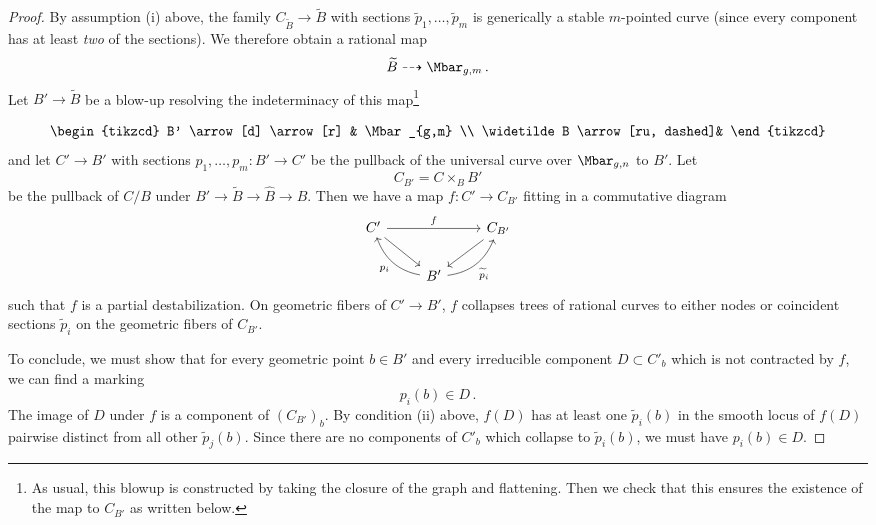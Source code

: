 \documentclass[a4paper,12pt]{article} %
\theoremstyle{definition}
\theoremstyle{plain}%
\newcommand{\jocomment}[1]{}
\begin{document}
\begin{proof}
By assumption (i) above, the family $C_{\widetilde B} \to \widetilde B$ with sections $\widetilde p_1, \ldots, \widetilde p_m$ is generically a stable $m$-pointed curve (since 
every component has at least \emph{two} of the sections). We therefore obtain
a rational map $$\widetilde B \dashrightarrow \Mbar_{g,m}\, .$$
Let $B' \to \widetilde B$ be a blow-up resolving the indeterminacy of this map\footnote{As usual, this blowup is constructed by taking the closure of the graph and flattening. Then we check that this ensures the existence of the map to $C_{B'}$ as written below.}

\begin{equation}
\begin{tikzcd}
B' \arrow[d] \arrow[r] & \Mbar_{g,m} \\
\widetilde B \arrow[ru, dashed]&
\end{tikzcd}    
\end{equation}
 and let $C' \to B'$ with sections $p_1, \ldots, p_m : B' \to C'$
 be the pullback of the universal curve over $\Mbar_{g,n}$ to $B'$. Let 
 $$C_{B'} = C \times_B B'$$ 
 be the pullback of $C/B$ under $B' \to \widetilde B \to \widehat B \to B$. Then we have a map $f: C' \to C_{B'}$ fitting in a commutative diagram
 \begin{equation} \label{eqn:partstabilizationalteration}
 \begin{tikzcd}
 C' \arrow[rr,"f"] \arrow[rd] & & C_{B'} \arrow[ld]\\
 & B' \arrow[ul,"p_i", bend left] \arrow[ur, "\widetilde p_i", bend right, swap] &
 \end{tikzcd}
 \end{equation}
 such that $f$ is a partial destabilization. On geometric fibers of $C'\to B'$,
 $f$ collapses trees of rational curves to either nodes or coincident
  sections $\widetilde p_i$ on
 the geometric fibers of $C_{B'}$.
 
 To conclude, we must show that for every geometric point $b \in B'$ and every irreducible component $D \subset C'_b$ which is not contracted by $f$, we can 
 find a marking 
 $$p_i(b)\in D \, .$$ 
 The image of $D$ under $f$ is a component of $(C_{B'})_b$.
 By condition (ii) above, $f(D)$
 has at least one $\widetilde p_i(b)$ in the smooth locus of $f(D)$
 pairwise distinct from all other $\widetilde p_j(b)$.
 Since there are no components of $C'_b$ which collapse to $\widetilde p_i(b)$, we
 must have $p_i(b) \in D$.
 \end{proof}
 
\end{document}
